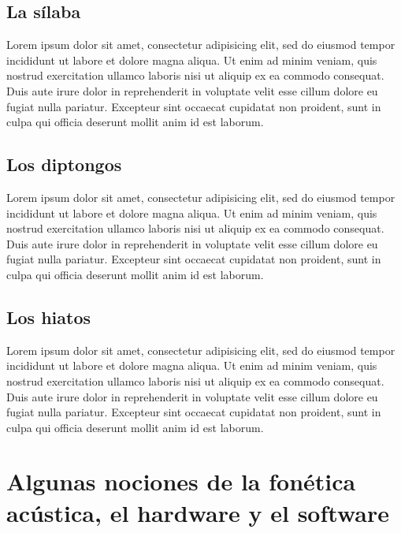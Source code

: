\documentclass[
]{book}
\begin{document}
\hypertarget{la-suxedlaba}{%
\section{La sílaba}\label{la-suxedlaba}}

Lorem ipsum dolor sit amet, consectetur adipisicing elit, sed do eiusmod
tempor incididunt ut labore et dolore magna aliqua. Ut enim ad minim veniam,
quis nostrud exercitation ullamco laboris nisi ut aliquip ex ea commodo
consequat. Duis aute irure dolor in reprehenderit in voluptate velit esse
cillum dolore eu fugiat nulla pariatur. Excepteur sint occaecat cupidatat non
proident, sunt in culpa qui officia deserunt mollit anim id est laborum.

\hypertarget{los-diptongos}{%
\section{Los diptongos}\label{los-diptongos}}

Lorem ipsum dolor sit amet, consectetur adipisicing elit, sed do eiusmod
tempor incididunt ut labore et dolore magna aliqua. Ut enim ad minim veniam,
quis nostrud exercitation ullamco laboris nisi ut aliquip ex ea commodo
consequat. Duis aute irure dolor in reprehenderit in voluptate velit esse
cillum dolore eu fugiat nulla pariatur. Excepteur sint occaecat cupidatat non
proident, sunt in culpa qui officia deserunt mollit anim id est laborum.

\hypertarget{los-hiatos}{%
\section{Los hiatos}\label{los-hiatos}}

Lorem ipsum dolor sit amet, consectetur adipisicing elit, sed do eiusmod
tempor incididunt ut labore et dolore magna aliqua. Ut enim ad minim veniam,
quis nostrud exercitation ullamco laboris nisi ut aliquip ex ea commodo
consequat. Duis aute irure dolor in reprehenderit in voluptate velit esse
cillum dolore eu fugiat nulla pariatur. Excepteur sint occaecat cupidatat non
proident, sunt in culpa qui officia deserunt mollit anim id est laborum.

\hypertarget{acustica-basica}{%
\chapter{Algunas nociones de la fonética acústica, el hardware y el software}\label{acustica-basica}}
\end{document}
